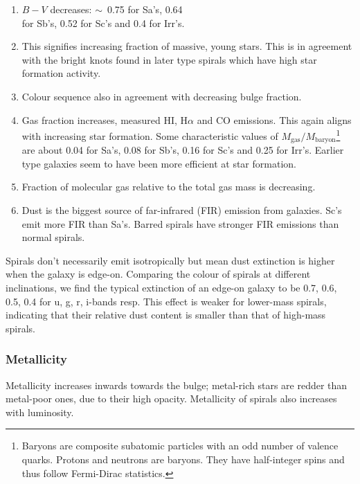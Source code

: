 \documentclass[a4paper,11pt]{report}
\newcommand{\tx}[1]{\text{#1}}
\newcommand{\tsim}{$\sim$}
\begin{document}
\begin{enumerate}[leftmargin=*, label=\roman*.]
  \item $B - V$ decreases: \tsim\, 0.75 for Sa's, 0.64 \\ for Sb's, 0.52 for Sc's and 0.4 for Irr's.
  \item This signifies increasing fraction of massive, young stars. This is in agreement with the bright knots found in later type spirals which have high star formation activity.
  \item Colour sequence also in agreement with decreasing bulge fraction.
  \item Gas fraction increases, measured H\RN{1}, H$\alpha$ and CO emissions. This again aligns with increasing star formation. Some characteristic values of $M_\tx{gas}/M_\tx{baryon}$\footnote{Baryons are composite subatomic particles with an odd number of valence quarks. Protons and neutrons are baryons. They have half-integer spins and thus follow Fermi-Dirac statistics.} are about 0.04 for Sa's, 0.08 for Sb's, 0.16 for Sc's and 0.25 for Irr's. Earlier type galaxies seem to have been more efficient at star formation.
  \item Fraction of molecular gas relative to the total gas mass is decreasing. 
  \item Dust is the biggest source of far-infrared (FIR) emission from galaxies. Sc's emit more FIR than Sa's. Barred spirals have stronger FIR emissions than normal spirals.
\end{enumerate}

\vspace{1em}

Spirals don't necessarily emit isotropically but mean dust extinction is higher when the galaxy is edge-on. Comparing the colour of spirals at different inclinations, we find the typical extinction of an edge-on galaxy to be 0.7, 0.6, 0.5, 0.4 for u, g, r, i-bands resp. This effect is weaker for lower-mass spirals, indicating that their relative dust content is smaller than that of high-mass spirals.

\subsubsection{Metallicity}
Metallicity increases inwards towards the bulge; metal-rich stars are redder than metal-poor ones, due to their high opacity. Metallicity of spirals also increases with luminosity.

\vspace{1em}
\end{document}
